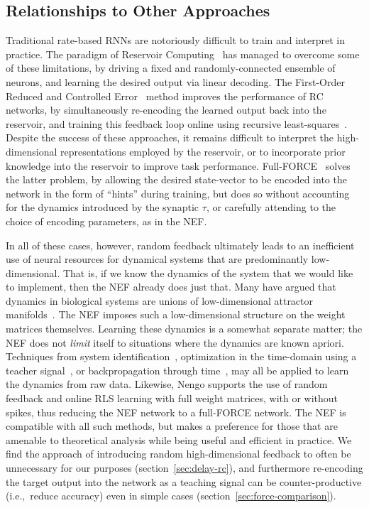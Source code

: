 \subsection{Relationships to Other Approaches}
\label{sec:relationships}

Traditional rate-based RNNs are notoriously difficult to train and interpret in practice.
The paradigm of Reservoir Computing~\citep[RC;][]{jaeger2001echo, maass2002real} has managed to overcome some of these limitations, by driving a fixed and randomly-connected ensemble of neurons, and learning the desired output via linear decoding.
The First-Order Reduced and Controlled Error~\citep[FORCE;][]{sussillo2009generating} method improves the performance of RC networks, by simultaneously re-encoding the learned output back into the reservoir, and training this feedback loop online using recursive least-squares~\citep[RLS;][]{haykin1991adaptive}.
Despite the success of these approaches, it remains difficult to interpret the high-dimensional representations employed by the reservoir, or to incorporate prior knowledge into the reservoir to improve task performance.
Full-FORCE~\citep{depasquale2018full} solves the latter problem, by allowing the desired state-vector to be encoded into the network in the form of ``hints'' during training, but does so without accounting for the dynamics introduced by the synaptic $\tau$, or carefully attending to the choice of encoding parameters, as in the NEF.

In all of these cases, however, random feedback ultimately leads to an inefficient use of neural resources for dynamical systems that are predominantly low-dimensional.
That is, if we know the dynamics of the system that we would like to implement, then the NEF already does just that.
Many have argued that dynamics in biological systems are unions of low-dimensional attractor manifolds~\citep{sussillo2013opening, cunningham2014dimensionality, waernberg2017low}.
The NEF imposes such a low-dimensional structure on the weight matrices themselves.
Learning these dynamics is a somewhat separate matter; the NEF does not \emph{limit} itself to situations where the dynamics are known apriori.
Techniques from system identification~\citep{nelles2013nonlinear}, optimization in the time-domain using a teacher signal~\citep{duggins2017incorporating}, or backpropagation through time~\citep{rasmussen2018nengodl}, may all be applied to learn the dynamics from raw data.
Likewise, Nengo supports the use of random feedback and online RLS learning with full weight matrices, with or without spikes, thus reducing the NEF network to a full-FORCE network.
The NEF is compatible with all such methods, but makes a preference for those that are amenable to theoretical analysis while being useful and efficient in practice.
We find the approach of introducing random high-dimensional feedback to often be unnecessary for our purposes (section~\ref{sec:delay-rc}), and furthermore re-encoding the target output into the network as a teaching signal can be counter-productive (i.e.,~reduce accuracy) even in simple cases (section~\ref{sec:force-comparison}).


